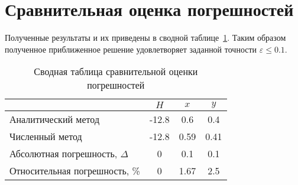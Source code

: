 \section{Сравнительная оценка погрешностей}

Полученные результаты и их приведены в сводной таблице~\ref{tab:tab3}. Таким образом полученное
приближенное решение удовлетворяет заданной точности \(\varepsilon \leq 0.1\).

\begin{table}[h]
    \centering
    \caption{Сводная таблица сравнительной оценки погрешностей}
    \begin{tabularx}{\textwidth}{|X|c|c|c|} \hline
        & $H$ & $x$ & $y$ \\ \hline
        Аналитический метод & -12.8 & 0.6 & 0.4 \\ \hline
        Численный метод & -12.8 & 0.59 & 0.41 \\ \hline
        Абсолютная погрешность, $\Delta$ & 0 & 0.1 & 0.1 \\ \hline
        Относительная погрешность, \% & 0 & 1.67 & 2.5 \\ \hline
    \end{tabularx}
    \label{tab:tab3}
\end{table}
